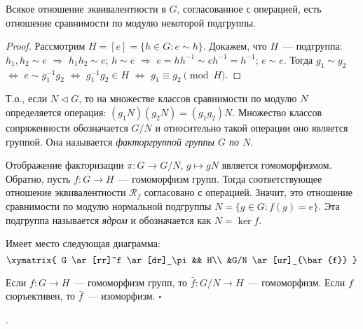 \documentclass[a4paper]{article}
\renewcommand{\Im}{\mathop{\mathrm{Im}}\nolimits}
\begin{document}
\begin{theorem}
Всякое отношение эквивалентности в $G$, согласованное с операцией,
есть отношение сравнимости по модулю некоторой подгруппы.
\end{theorem}

\begin{proof}
Рассмотрим $H=[e]=\{h\in G: e\sim h\}$. Докажем, что $H$~---
подгруппа: $h_1,h_2\sim e$ $\Rightarrow$ $h_1h_2\sim e$; $h\sim e$
$\Rightarrow$ $e=hh^{-1}\sim e h^{-1}=h^{-1}$; $e\sim e$. Тогда
$g_1\sim g_2$ $\Leftrightarrow$ $e\sim g_1^{-1}g_2$
$\Leftrightarrow$ $g_1^{-1}g_2\in H$ $\Leftrightarrow$ $g_1\equiv
g_2\pmod{H}$.
\end{proof}

Т.о., если $N\triangleleft G$, то на множестве классов сравнимости
по модулю $N$ определяется операция: $(g_1N)(g_2N)=(g_1g_2)N$.
Множество классов сопряженности обозначается $G/N$  и относительно
такой операции оно является группой. Она называется
\emph{факторгруппой группы $G$ по $N$}.

Отображение факторизации $\pi\colon G\to G/N$, $g\mapsto gN$
является гомоморфизмом. Обратно, пусть $f\colon G\to H$~---
гомоморфизм групп. Тогда соответствующее отношение эквивалентности
$\mathcal{R}_f$ согласовано с операцией. Значит, это отношение
сравнимости по модулю нормальной подгруппы $N=\{g\in G: f(g)=e\}$.
Эта подгруппа называется \emph{ядром} и обозначается как $N=\ker f$.

Имеет место следующая диаграмма:
$$\xymatrix{
 G \ar[rr]^f \ar[dr]_\pi && H\\
&G/N \ar[ur]_{\bar{f}} }$$

\begin{theorem}
Если $f\colon G\to H$~--- гомоморфизм групп, то $\bar{f}\colon
G/N\to H$~--- гомоморфизм. Если $f$ сюръективен, то $\bar{f}$~---
изоморфизм. $\square$
\end{theorem}

\zam{В общем случае $G/\ker f\simeq \Im f$}.
\end{document}
